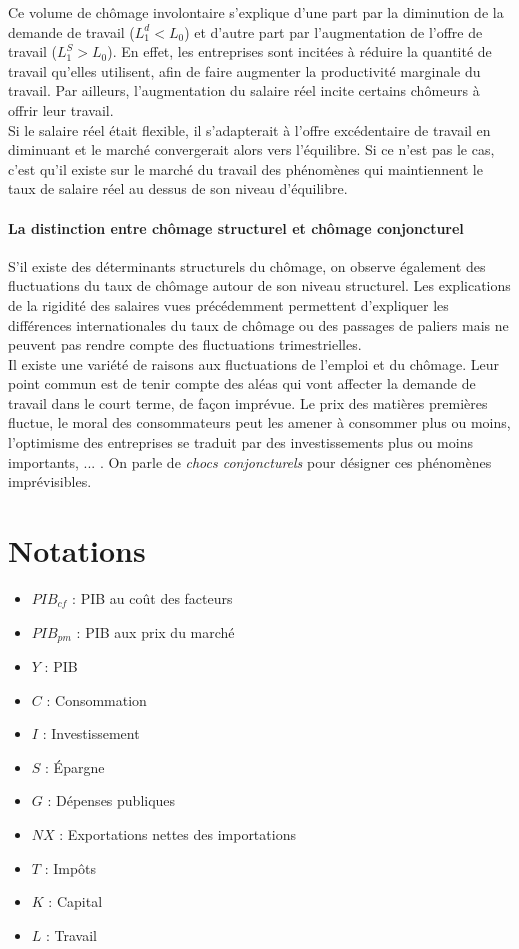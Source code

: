 \documentclass[10pt]{book}
\begin{document}
Ce volume de chômage involontaire s'explique d'une part par la diminution de la demande de travail ($L_1^d < L_0$) et d'autre part par l'augmentation de l'offre de travail ($L_1^S > L_0$). En effet, les entreprises sont incitées à réduire la quantité de travail qu'elles utilisent, afin de faire augmenter la productivité marginale du travail. Par ailleurs, l'augmentation du salaire réel incite certains chômeurs à offrir leur travail. \\
Si le salaire réel était flexible, il s'adapterait à l'offre excédentaire de travail en diminuant et le marché convergerait alors vers l'équilibre. Si ce n'est pas le cas, c'est qu'il existe sur le marché du travail des phénomènes qui maintiennent le taux de salaire réel au dessus de son niveau d'équilibre.
\subsubsection{La distinction entre chômage structurel et chômage conjoncturel}
S'il existe des déterminants structurels du chômage, on observe également des fluctuations du taux de chômage autour de son niveau structurel. Les explications de la rigidité des salaires vues précédemment permettent d'expliquer les différences internationales du taux de chômage ou des passages de paliers mais ne peuvent pas rendre compte des fluctuations trimestrielles. \\
Il existe une variété de raisons aux fluctuations de l'emploi et du chômage. Leur point commun est de tenir compte des aléas qui vont affecter la demande de travail dans le court terme, de façon imprévue. Le prix des matières premières fluctue, le moral des consommateurs peut les amener à consommer plus ou moins, l'optimisme des entreprises se traduit par des investissements plus ou moins importants, ... . On parle de \textit{chocs conjoncturels} pour désigner ces phénomènes imprévisibles.



\appendix
\chapter{Notations} 
\begin{itemize}
  \item $PIB_{cf}$ : PIB au coût des facteurs
  \item $PIB_{pm}$ : PIB aux prix du marché
  \item $Y$ : PIB
  \item $C$ : Consommation
  \item $I$ : Investissement
  \item $S$ : Épargne
  \item $G$ : Dépenses publiques
  \item $NX$ : Exportations nettes des importations
  \item $T$ : Impôts
  \item $K$ : Capital
  \item $L$ : Travail
\end{itemize}
\end{document}
